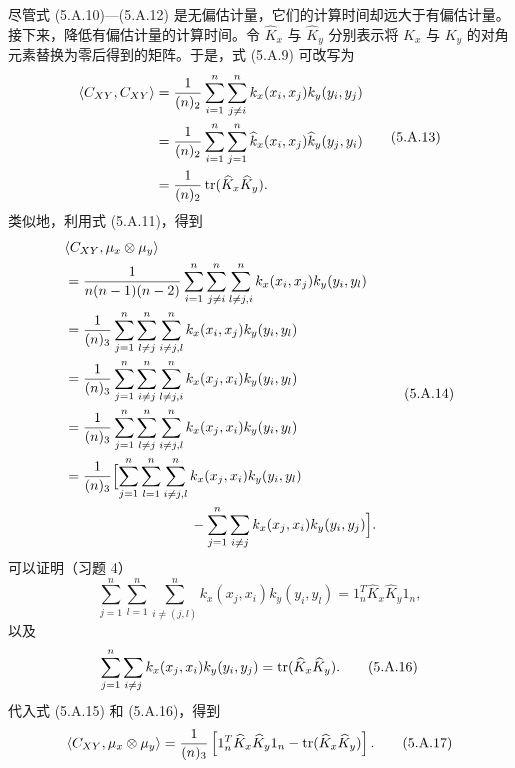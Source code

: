 尽管式 (5.A.10)—(5.A.12) 是无偏估计量，它们的计算时间却远大于有偏估计量。接下来，降低有偏估计量的计算时间。令 $\widehat K_x$ 与 $\widehat K_y$ 分别表示将 $K_x$ 与 $K_y$ 的对角元素替换为零后得到的矩阵。于是，式 (5.A.9) 可改写为
\begin{equation}
\begin{aligned}
\langle C_{XY},C_{XY}\rangle
&=\frac1{(n)_2}\sum_{i=1}^n\sum_{j\ne i}^nk_x(x_i,x_j)k_y(y_i,y_j)\\
&=\frac1{(n)_2}\sum_{i=1}^n\sum_{j=1}^n\widehat k_x(x_i,x_j)\widehat k_y(y_j,y_i)\\
&=\frac1{(n)_2}\operatorname{tr}(\widehat K_x\widehat K_y).
\end{aligned}
\tag{5.A.13}
\end{equation}
类似地，利用式 (5.A.11)，得到
\begin{equation}
\begin{aligned}
&\langle C_{XY},\mu_x\otimes\mu_y\rangle\\
&=\frac1{n(n-1)(n-2)}\sum_{i=1}^n\sum_{j\ne i}^n\sum_{l\ne j,i}^nk_x(x_i,x_j)k_y(y_i,y_l)\\
&=\frac1{(n)_3}\sum_{j=1}^n\sum_{l\ne j}^n\sum_{i\ne j,l}^nk_x(x_i,x_j)k_y(y_i,y_l)\\
&=\frac1{(n)_3}\sum_{j=1}^n\sum_{i\ne j}^n\sum_{l\ne j,i}^nk_x(x_j,x_i)k_y(y_i,y_l)\\
&=\frac1{(n)_3}\sum_{j=1}^n\sum_{l\ne j}^n\sum_{i\ne j,l}^nk_x(x_j,x_i)k_y(y_i,y_l)\\
&=\frac1{(n)_3}\Bigl[\sum_{j=1}^n\sum_{l=1}^n\sum_{i\ne j,l}^nk_x(x_j,x_i)k_y(y_i,y_l)\\
&\hspace{9em}-\sum_{j=1}^n\sum_{i\ne j}k_x(x_j,x_i)k_y(y_i,y_j)\Bigr].
\end{aligned}
\tag{5.A.14}
\end{equation}
可以证明（习题 4）
\begin{equation}
\sum_{j=1}^n\sum_{l=1}^n\sum_{i\ne(j,l)}^nk_x(x_j,x_i)k_y(y_i,y_l)
=1_n^T\widehat K_x\widehat K_y1_n,
\tag{5.A.15}
\end{equation}
以及
\begin{equation}
\sum_{j=1}^n\sum_{i\ne j}k_x(x_j,x_i)k_y(y_i,y_j)
=\operatorname{tr}(\widehat K_x\widehat K_y).
\tag{5.A.16}
\end{equation}
代入式 (5.A.15) 和 (5.A.16)，得到
\begin{equation}
\langle C_{XY},\mu_x\otimes\mu_y\rangle
=\frac1{(n)_3}\left[1_n^T\widehat K_x\widehat K_y1_n-\operatorname{tr}(\widehat K_x\widehat K_y)\right].
\tag{5.A.17}
\end{equation}
